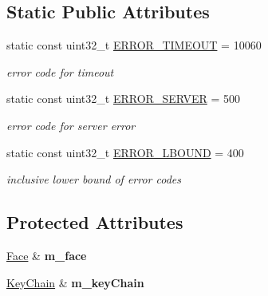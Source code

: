 \subsection*{Static Public Attributes}
\begin{DoxyCompactItemize}
\item 
static const uint32\+\_\+t \hyperlink{classndn_1_1nfd_1_1Controller_a0d52c3cd0677c88e2bb519510a4e50a3}{E\+R\+R\+O\+R\+\_\+\+T\+I\+M\+E\+O\+UT} = 10060
\begin{DoxyCompactList}\small\item\em error code for timeout \end{DoxyCompactList}\item 
static const uint32\+\_\+t \hyperlink{classndn_1_1nfd_1_1Controller_a18e418f22fb63806938362c0e7201143}{E\+R\+R\+O\+R\+\_\+\+S\+E\+R\+V\+ER} = 500\hypertarget{classndn_1_1nfd_1_1Controller_a18e418f22fb63806938362c0e7201143}{}\label{classndn_1_1nfd_1_1Controller_a18e418f22fb63806938362c0e7201143}

\begin{DoxyCompactList}\small\item\em error code for server error \end{DoxyCompactList}\item 
static const uint32\+\_\+t \hyperlink{classndn_1_1nfd_1_1Controller_a1bb9e1924c4d94cdbe69ec3d0eb22557}{E\+R\+R\+O\+R\+\_\+\+L\+B\+O\+U\+ND} = 400\hypertarget{classndn_1_1nfd_1_1Controller_a1bb9e1924c4d94cdbe69ec3d0eb22557}{}\label{classndn_1_1nfd_1_1Controller_a1bb9e1924c4d94cdbe69ec3d0eb22557}

\begin{DoxyCompactList}\small\item\em inclusive lower bound of error codes \end{DoxyCompactList}\end{DoxyCompactItemize}
\subsection*{Protected Attributes}
\begin{DoxyCompactItemize}
\item 
\hyperlink{classndn_1_1Face}{Face} \& {\bfseries m\+\_\+face}\hypertarget{classndn_1_1nfd_1_1Controller_a33e90f5eb0213b69d57525446577d5e3}{}\label{classndn_1_1nfd_1_1Controller_a33e90f5eb0213b69d57525446577d5e3}

\item 
\hyperlink{classndn_1_1security_1_1KeyChain}{Key\+Chain} \& {\bfseries m\+\_\+key\+Chain}\hypertarget{classndn_1_1nfd_1_1Controller_a3ec5c32106e1876acbf8493c463eeaef}{}\label{classndn_1_1nfd_1_1Controller_a3ec5c32106e1876acbf8493c463eeaef}

\end{DoxyCompactItemize}


